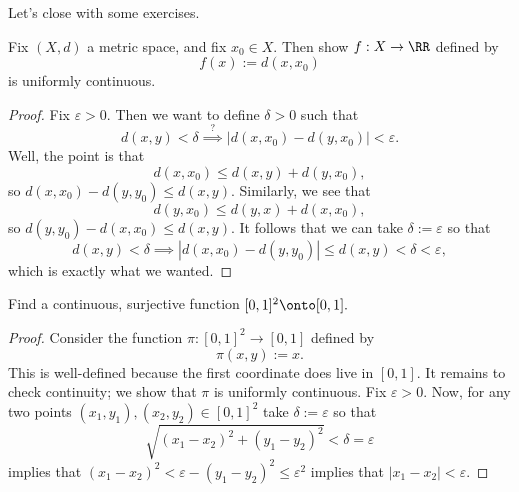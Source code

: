 Let's close with some exercises.
\begin{exercise}
	Fix $(X,d)$ a metric space, and fix $x_0\in X.$ Then show $f:X\to\RR$ defined by
	\[f(x):=d(x,x_0)\]
	is uniformly continuous.
\end{exercise}
\begin{proof}
	Fix $\varepsilon>0.$ Then we want to define $\delta>0$ such that
	\[d(x,y)<\delta\stackrel?\implies|d(x,x_0)-d(y,x_0)|<\varepsilon.\]
	Well, the point is that
	\[d(x,x_0)\le d(x,y)+d(y,x_0),\]
	so $d(x,x_0)-d(y,y_0)\le d(x,y).$ Similarly, we see that
	\[d(y,x_0)\le d(y,x)+d(x,x_0),\]
	so $d(y,y_0)-d(x,x_0)\le d(x,y).$ It follows that we can take $\delta:=\varepsilon$ so that
	\[d(x,y)<\delta\implies|d(x,x_0)-d(y,y_0)|\le d(x,y)<\delta<\varepsilon,\]
	which is exactly what we wanted.
\end{proof}
\begin{exercise}[Ross 21.9]
	Find a continuous, surjective function $[0,1]^2\onto[0,1].$
\end{exercise}
\begin{proof}
	Consider the function $\pi:[0,1]^2\to[0,1]$ defined by
	\[\pi(x,y):=x.\]
	This is well-defined because the first coordinate does live in $[0,1].$ It remains to check continuity; we show that $\pi$ is uniformly continuous. Fix $\varepsilon>0.$ Now, for any two points $(x_1,y_1),(x_2,y_2)\in[0,1]^2$ take $\delta:=\varepsilon$ so that
	\[\sqrt{(x_1-x_2)^2+(y_1-y_2)^2}<\delta=\varepsilon\]
	implies that $(x_1-x_2)^2<\varepsilon-(y_1-y_2)^2\le\varepsilon^2$ implies that $|x_1-x_2|<\varepsilon.$
\end{proof}